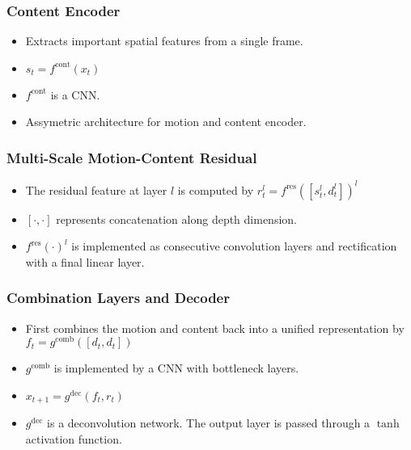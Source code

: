 \documentclass{article}
\begin{document}
    \subsubsection{Content Encoder}\label{subsubsec:Decomposing_Motion_and_Content_for_Natural_Video_Sequence_Prediction:content-encoder}
    \begin{itemize}
        \item Extracts important spatial features from a single frame.
        \item $s_t = f^{\textrm{cont}}(x_t)$
        \item $f^{\textrm{cont}}$ is a CNN\@.
        \item Assymetric architecture for motion and content encoder.
    \end{itemize}

    \subsubsection{Multi-Scale Motion-Content Residual}\label{subsubsec:Decomposing_Motion_and_Content_for_Natural_Video_Sequence_Prediction:multi-scale-motion-content-residual}
    \begin{itemize}
        \item The residual feature at layer $l$ is computed by $r_t^l = f^{\textrm{res}}([s_t^l, d_t^l])^l$
        \item $[\cdot,\cdot]$ represents concatenation along depth dimension.
        \item $f^{\textrm{res}}(\cdot)^l$ is implemented as consecutive convolution layers and rectification with a final linear layer.
    \end{itemize}

    \subsubsection{Combination Layers and Decoder}\label{subsubsec:Decomposing_Motion_and_Content_for_Natural_Video_Sequence_Prediction:combination-layers-and-decoder}
    \begin{itemize}
        \item First combines the motion and content back into a unified representation by $f_t = g^{\textrm{comb}}([d_t, d_t])$
        \item $g^{\textrm{comb}}$ is implemented by a CNN with bottleneck layers.
        \item $x_{t+1} = g^{\textrm{dec}}(f_t, r_t)$
        \item $g^{\textrm{dec}}$ is a deconvolution network.
        The output layer is passed through a $\tanh$ activation function.
    \end{itemize}
\end{document}
